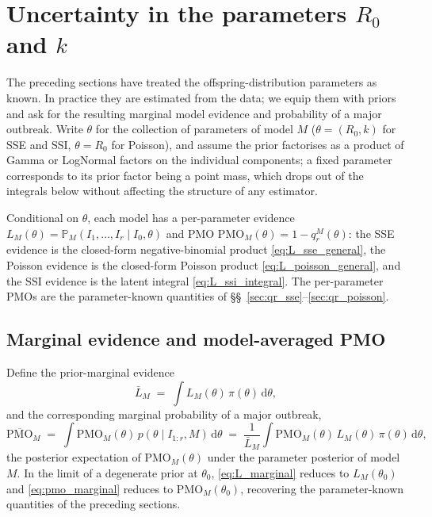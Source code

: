\documentclass{article}
\theoremstyle{definition}
\begin{document}
\section{Uncertainty in the parameters \(R_0\) and \(k\)}
\label{sec:param_uncertain}

The preceding sections have treated the offspring-distribution
parameters as known.  In practice they are estimated from the data; we
equip them with priors and ask for the resulting marginal model
evidence and probability of a major outbreak.  Write \(\theta\) for the
collection of parameters of model \(M\)
(\(\theta = (R_0, k)\) for SSE and SSI, \(\theta = R_0\) for Poisson),
and assume the prior factorises as a product of Gamma or LogNormal
factors on the individual components; a fixed parameter corresponds to
its prior factor being a point mass, which drops out of the integrals
below without affecting the structure of any estimator.

Conditional on \(\theta\), each model has a per-parameter evidence
\(L_M(\theta) = \mathbb{P}_M(I_1, \ldots, I_r \mid I_0, \theta)\) and
PMO \(\mathrm{PMO}_M(\theta) = 1 - q_r^M(\theta)\): the SSE evidence is
the closed-form negative-binomial product \eqref{eq:L_sse_general}, the
Poisson evidence is the closed-form Poisson product
\eqref{eq:L_poisson_general}, and the SSI evidence is the latent
integral \eqref{eq:L_ssi_integral}.  The per-parameter PMOs are the
parameter-known quantities of \S\S~\ref{sec:qr_sse}--\ref{sec:qr_poisson}.

\subsection{Marginal evidence and model-averaged PMO}

Define the prior-marginal evidence
\begin{equation}\label{eq:L_marginal}
  \bar L_M \;=\; \int L_M(\theta)\, \pi(\theta)\, \mathrm{d}\theta,
\end{equation}
and the corresponding marginal probability of a major outbreak,
\begin{equation}\label{eq:pmo_marginal}
  \overline{\mathrm{PMO}}_M
  \;=\; \int \mathrm{PMO}_M(\theta)\,
        p(\theta \mid I_{1:r}, M)\, \mathrm{d}\theta
  \;=\; \frac{1}{\bar L_M}
        \int \mathrm{PMO}_M(\theta)\, L_M(\theta)\, \pi(\theta)\,
              \mathrm{d}\theta,
\end{equation}
the posterior expectation of \(\mathrm{PMO}_M(\theta)\) under the
parameter posterior of model \(M\).  In the limit of a degenerate
prior at \(\theta_0\), \eqref{eq:L_marginal} reduces to
\(L_M(\theta_0)\) and \eqref{eq:pmo_marginal} reduces to
\(\mathrm{PMO}_M(\theta_0)\), recovering the parameter-known
quantities of the preceding sections.
\end{document}
